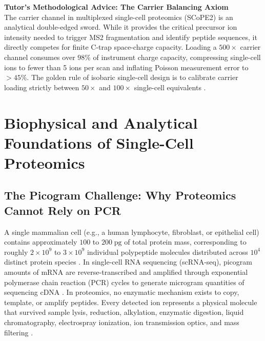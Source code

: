 \documentclass[11pt,twoside,openright]{book}
\begin{document}
\FloatBarrier

\begin{notebox}
\textbf{Tutor's Methodological Advice: The Carrier Balancing Axiom}\\
The carrier channel in multiplexed single-cell proteomics (SCoPE2) is an analytical double-edged sword. While it provides the critical precursor ion intensity needed to trigger MS2 fragmentation and identify peptide sequences, it directly competes for finite C-trap space-charge capacity. Loading a $500\times$ carrier channel consumes over $98\%$ of instrument charge capacity, compressing single-cell ions to fewer than 5 ions per scan and inflating Poisson measurement error to $>45\%$. The golden rule of isobaric single-cell design is to calibrate carrier loading strictly between $50\times$ and $100\times$ single-cell equivalents \cite{slavov2021scope2, cheung2021carrier, sielaff2023evaluation}.
\end{notebox}

\section{Biophysical and Analytical Foundations of Single-Cell Proteomics}

\subsection{The Picogram Challenge: Why Proteomics Cannot Rely on PCR}

A single mammalian cell (e.g., a human lymphocyte, fibroblast, or epithelial cell) contains approximately $100$ to $200\;\text{pg}$ of total protein mass, corresponding to roughly $2 \times 10^9$ to $3 \times 10^9$ individual polypeptide molecules distributed across $10^4$ distinct protein species \cite{steger2021single, aebersold2016mass}. In single-cell RNA sequencing (scRNA-seq), picogram amounts of mRNA are reverse-transcribed and amplified through exponential polymerase chain reaction (PCR) cycles to generate microgram quantities of sequencing cDNA \cite{lun2016pooling}. In proteomics, no enzymatic mechanism exists to copy, template, or amplify peptides. Every detected ion represents a physical molecule that survived sample lysis, reduction, alkylation, enzymatic digestion, liquid chromatography, electrospray ionization, ion transmission optics, and mass filtering \cite{kelly2020single}.
\end{document}
